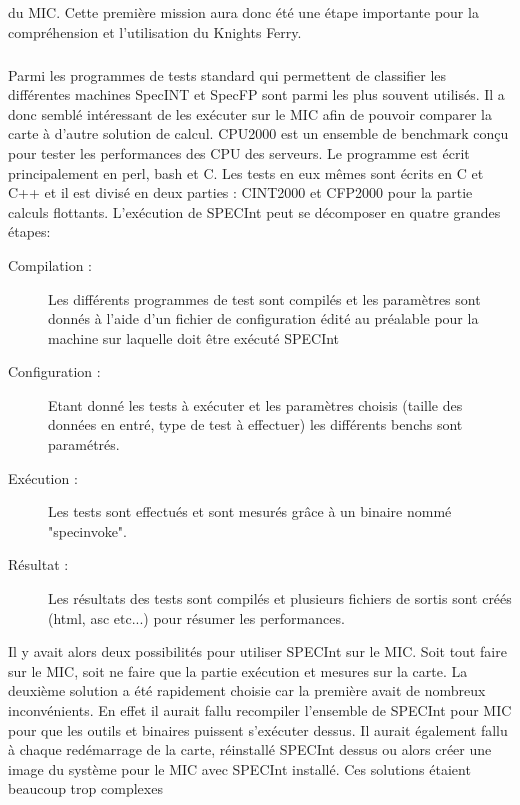 \documentclass{article}
\begin{document}
					du MIC. Cette première mission aura donc été une étape importante pour la compréhension et l'utilisation 
					du Knights Ferry.
					\subparagraph{}
					Parmi les programmes de tests standard qui permettent de classifier les différentes machines SpecINT et 
					SpecFP sont parmi les plus souvent utilisés. Il a donc semblé intéressant de les exécuter sur le MIC
					afin de pouvoir comparer la carte à d'autre solution de calcul. \newline
					CPU2000 est un ensemble de benchmark conçu pour tester les performances des CPU des serveurs. Le programme
					est écrit principalement en perl, bash et C. Les tests en eux mêmes sont écrits en C et C++ et il est 
					divisé en deux parties : CINT2000 et CFP2000 pour la partie calculs flottants. \newline
					L'exécution de SPECInt peut se décomposer en quatre grandes étapes: \newline
					\begin{description}
					\item[Compilation :]
						Les différents programmes de test sont compilés et les paramètres sont donnés à l'aide d'un fichier
						de configuration édité au préalable pour la machine sur laquelle doit être exécuté SPECInt
					\item [Configuration :]
						Etant donné les tests à exécuter et les paramètres choisis (taille des données en entré, type de test
						à effectuer) les différents benchs sont paramétrés.
					\item [Exécution :]
						Les tests sont effectués et sont mesurés grâce à un binaire nommé "specinvoke".
					\item [Résultat :]
						Les résultats des tests sont compilés et plusieurs fichiers de sortis sont créés (html, asc etc...)
						pour résumer les performances.
					\end{description}
					Il y avait alors deux possibilités pour utiliser SPECInt sur le MIC. Soit tout faire sur le MIC, soit 
					ne faire que la partie exécution et mesures sur la carte. \newline
					La deuxième solution a été rapidement choisie car la première avait de nombreux inconvénients. En effet il 
					aurait fallu recompiler l'ensemble de SPECInt pour MIC pour que les outils et binaires puissent s'exécuter
					dessus. Il aurait également fallu à chaque redémarrage de la carte, réinstallé SPECInt dessus ou alors 
					créer une image du système pour le MIC avec SPECInt installé. Ces solutions étaient beaucoup trop complexes
\end{document}
